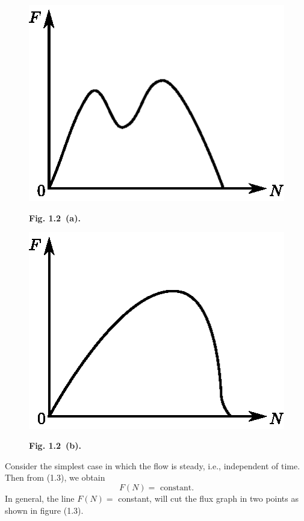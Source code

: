 \noindent
\begin{minipage}[C]{5cm}
\begin{figure}[H]
\centering
\includegraphics[scale=0.9]{figures/fig1.2a.eps}
\centerline{\bf Fig. 1.2~(a).}
\end{figure}
\end{minipage}
\quad 
\begin{minipage}[C]{5cm}
\begin{figure}[H]
\centering
\includegraphics[scale=0.9]{figures/fig1.2b.eps}
\centerline{\bf Fig. 1.2~(b).}
\end{figure}
\end{minipage}

\bigskip

Consider the simplest case in which the flow is steady, i.e., independent of time. Then from (1.3), we obtain
$$
F(N) = \text{ constant}.
$$
In general, the line $F(N) = $ constant, will cut the flux graph in two points as shown in figure (1.3).

